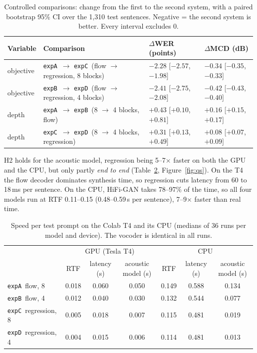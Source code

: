 \documentclass[11pt,a4paper]{article}
\newcommand{\expA}{\texttt{expA}}
\newcommand{\expB}{\texttt{expB}}
\newcommand{\expC}{\texttt{expC}}
\newcommand{\expD}{\texttt{expD}}
\newcommand{\ci}[2]{{\scriptsize[#1, #2]}}
\begin{document}
\begin{table}[H]
\centering\small
\caption{Controlled comparisons: change from the first to the second system, with a paired bootstrap 95\% CI over the 1{,}310 test sentences. Negative = the second system is better. Every interval excludes 0.}
\label{tab:compare}
\begin{tabular}{@{}lll@{\hspace{6mm}}l@{}}
\toprule
Variable & Comparison & $\Delta$WER (points) & $\Delta$MCD (dB) \\ \midrule
objective & \expA\ $\rightarrow$ \expC\ (flow $\rightarrow$ regression, 8 blocks) & $-2.28$ \ci{$-2.57$}{$-1.98$} & $-0.34$ \ci{$-0.35$}{$-0.33$} \\
objective & \expB\ $\rightarrow$ \expD\ (flow $\rightarrow$ regression, 4 blocks) & $-2.41$ \ci{$-2.75$}{$-2.08$} & $-0.42$ \ci{$-0.43$}{$-0.40$} \\
depth & \expA\ $\rightarrow$ \expB\ (8 $\rightarrow$ 4 blocks, flow) & $+0.43$ \ci{$+0.10$}{$+0.81$} & $+0.16$ \ci{$+0.15$}{$+0.17$} \\
depth & \expC\ $\rightarrow$ \expD\ (8 $\rightarrow$ 4 blocks, regression) & $+0.31$ \ci{$+0.13$}{$+0.49$} & $+0.08$ \ci{$+0.07$}{$+0.09$} \\ \bottomrule
\end{tabular}
\end{table}

\noindent H2 holds for the acoustic model, regression being 5--7$\times$ faster on both the GPU and the CPU, but only partly \emph{end to end} (Table~\ref{tab:speed}, Figure~\ref{fig:qs}). On the T4 the flow decoder dominates synthesis time, so regression cuts latency from 60 to 18\,ms per sentence. On the CPU, HiFi-GAN takes 78--97\% of the time, so all four models run at RTF 0.11--0.15 (0.48--0.59\,s per sentence), 7--9$\times$ faster than real time.

\begin{table}[H]
\centering\small
\caption{Speed per test prompt on the Colab T4 and its CPU (medians of 36 runs per model and device). The vocoder is identical in all runs.}
\label{tab:speed}
\begin{tabular}{@{}l|ccc|ccc@{}}
\toprule
 & \multicolumn{3}{c|}{GPU (Tesla T4)} & \multicolumn{3}{c}{CPU} \\
 & RTF & latency (s) & acoustic model (s) & RTF & latency (s) & acoustic model (s) \\ \midrule
\expA\ flow, 8 & 0.018 & 0.060 & 0.050 & 0.149 & 0.588 & 0.134 \\
\expB\ flow, 4 & 0.012 & 0.040 & 0.030 & 0.132 & 0.544 & 0.077 \\
\expC\ regression, 8 & 0.005 & 0.018 & 0.007 & 0.115 & 0.481 & 0.019 \\
\expD\ regression, 4 & 0.004 & 0.015 & 0.006 & 0.114 & 0.481 & 0.013 \\ \bottomrule
\end{tabular}
\end{table}
\end{document}
